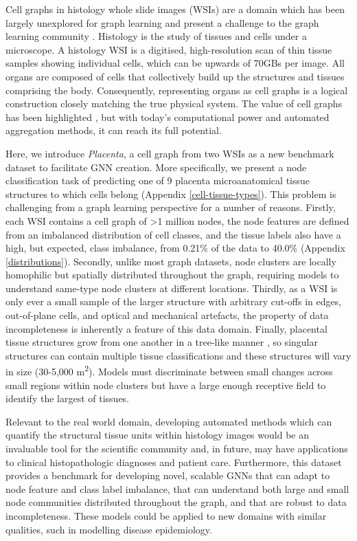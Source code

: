 \documentclass{article}
\begin{document}
Cell graphs in histology whole slide images (WSIs) are a domain which has been largely unexplored for graph learning and present a challenge to the graph learning community \cite{lu_capturing_2020,zhou_cgc-net_2019,gadiya_histographs_2019,chen_pathomic_2020,lu_slidegraph_2022}. Histology is the study of tissues and cells under a microscope. A histology WSI is a digitised, high-resolution scan of thin tissue samples showing individual cells, which can be upwards of 70GBs per image. All organs are composed of cells that collectively build up the structures and tissues comprising the body. Consequently, representing organs as cell graphs is a logical construction closely matching the true physical system. The value of cell graphs has been highlighted \cite{yener_cell-graphs_2017,javed_cellular_2020,sirinukunwattana_novel_2018}, but with today's computational power and automated aggregation methods, it can reach its full potential.

Here, we introduce \emph{Placenta}, a cell graph from two WSIs as a new benchmark dataset to facilitate GNN creation. More specifically, we present a node classification task of predicting one of 9 placenta microanatomical tissue structures to which cells belong (Appendix \ref{cell-tissue-types}). This problem is challenging from a graph learning perspective for a number of reasons. Firstly, each WSI contains a cell graph of >1 million nodes, the node features are defined from an imbalanced distribution of cell classes, and the tissue labels also have a high, but expected, class imbalance, from 0.21\% of the data to 40.0\% (Appendix \ref{distributions}). Secondly, unlike most graph datasets, node clusters are locally homophilic but spatially distributed throughout the graph, requiring models to understand same-type node clusters at different locations. Thirdly, as a WSI is only ever a small sample of the larger structure with arbitrary cut-offs in edges, out-of-plane cells, and optical and mechanical artefacts, the property of data incompleteness is inherently a feature of this data domain. Finally, placental tissue structures grow from one another in a tree-like manner \cite{benirschke_architecture_2012,ernst_placenta_2019}, so singular structures can contain multiple tissue classifications and these structures will vary in size (30-5,000 m\textsuperscript{2}). Models must discriminate between small changes across small regions within node clusters but have a large enough receptive field to identify the largest of tissues. 

Relevant to the real world domain, developing automated methods which can quantify the structural tissue units within histology images would be an invaluable tool for the scientific community and, in future, may have applications to clinical histopathologic diagnoses and patient care. Furthermore, this dataset provides a benchmark for developing novel, scalable GNNs that can adapt to node feature and class label imbalance, that can understand both large and small node communities distributed throughout the graph, and that are robust to data incompleteness. These models could be applied to new domains with similar qualities, such in modelling disease epidemiology. 
\end{document}
